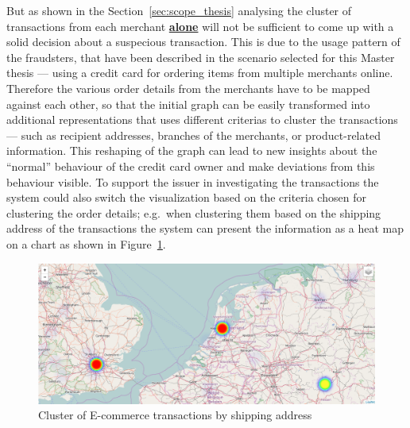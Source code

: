 But as shown in the Section~\ref{sec:scope_thesis} analysing the cluster of transactions from each merchant \textbf{\underline{alone}} will not be sufficient to come up with a solid decision about a suspecious transaction. This is due to the usage pattern of the fraudsters, that have been described in the scenario selected for this Master thesis --- using a credit card for ordering items from multiple merchants online. Therefore the various order details from the merchants have to be mapped against each other, so that the initial graph can be easily transformed into additional representations that uses different criterias to cluster the transactions --- such as recipient addresses, branches of the merchants, or product-related information. This reshaping of the graph can lead to new insights about the ``normal'' behaviour of the credit card owner and make deviations from this behaviour visible. To support the issuer in investigating the transactions the system could also switch the visualization based on the criteria chosen for clustering the order details; e.g.\ when clustering them based on the shipping address of the transactions the system can present the information as a heat map on a chart as shown in Figure~\ref{fig:images_map_heatmap}. \@

\begin{figure}[H]
  \centering
  \includegraphics[width=0.9\columnwidth]{images/Heatmap.png}
  \caption{Cluster of E-commerce transactions by shipping address}
\label{fig:images_map_heatmap}
\end{figure}


